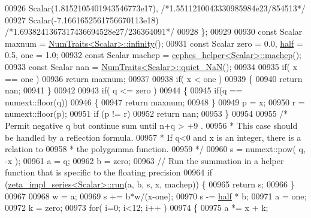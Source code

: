 \begin{DoxyCode}
00926             Scalar(1.8152105401943546773e17), \textcolor{comment}{/*1.5511210043330985984e23/854513*/}
00927             Scalar(-7.1661652561756670113e18) \textcolor{comment}{/*1.6938241367317436694528e27/236364091*/}
00928             \};
00929 
00930         \textcolor{keyword}{const} Scalar maxnum = \hyperlink{group___core___module_struct_eigen_1_1_num_traits}{NumTraits<Scalar>::infinity}();
00931         \textcolor{keyword}{const} Scalar zero = 0.0, \hyperlink{struct_eigen_1_1half}{half} = 0.5, one = 1.0;
00932         \textcolor{keyword}{const} Scalar machep = \hyperlink{struct_eigen_1_1internal_1_1cephes__helper}{cephes\_helper<Scalar>::machep}();
00933         \textcolor{keyword}{const} Scalar nan = \hyperlink{group___core___module_struct_eigen_1_1_num_traits}{NumTraits<Scalar>::quiet\_NaN}();
00934 
00935         \textcolor{keywordflow}{if}( x == one )
00936             \textcolor{keywordflow}{return} maxnum;
00937 
00938         \textcolor{keywordflow}{if}( x < one )
00939         \{
00940             \textcolor{keywordflow}{return} nan;
00941         \}
00942 
00943         \textcolor{keywordflow}{if}( q <= zero )
00944         \{
00945             \textcolor{keywordflow}{if}(q == numext::floor(q))
00946             \{
00947                 \textcolor{keywordflow}{return} maxnum;
00948             \}
00949             p = x;
00950             r = numext::floor(p);
00951             \textcolor{keywordflow}{if} (p != r)
00952                 \textcolor{keywordflow}{return} nan;
00953         \}
00954 
00955         \textcolor{comment}{/* Permit negative q but continue sum until n+q > +9 .}
00956 \textcolor{comment}{         * This case should be handled by a reflection formula.}
00957 \textcolor{comment}{         * If q<0 and x is an integer, there is a relation to}
00958 \textcolor{comment}{         * the polygamma function.}
00959 \textcolor{comment}{         */}
00960         s = numext::pow( q, -x );
00961         a = q;
00962         b = zero;
00963         \textcolor{comment}{// Run the summation in a helper function that is specific to the floating precision}
00964         \textcolor{keywordflow}{if} (\hyperlink{struct_eigen_1_1internal_1_1zeta__impl__series}{zeta\_impl\_series<Scalar>::run}(a, b, s, x, machep)) \{
00965             \textcolor{keywordflow}{return} s;
00966         \}
00967 
00968         w = a;
00969         s += b*w/(x-one);
00970         s -= \hyperlink{struct_eigen_1_1half}{half} * b;
00971         a = one;
00972         k = zero;
00973         \textcolor{keywordflow}{for}( i=0; i<12; i++ )
00974         \{
00975             a *= x + k;

\end{DoxyCode}
